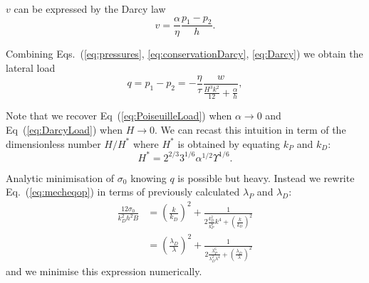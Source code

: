 \documentclass[twocolumn,superscriptaddress,showpacs,preprintnumbers,
amsmath,amssymb,prl]{revtex4-1}
\begin{document}
$v$ can be expressed by the Darcy law
\begin{equation}
v = \frac{\alpha}{\eta} \frac{p_1-p_2}{h}.
\label{eq:Darcy}
\end{equation}

Combining Eqs.~(\ref{eq:pressures}, \ref{eq:conservationDarcy}, \ref{eq:Darcy}) we obtain the lateral load
\begin{equation}
q = p_1-p_2 = - \frac{\eta}{\tau} \frac{w}{\frac{H^3 k^2}{12} + \frac{\alpha}{h}},
\label{eq:MixtLoad}
\end{equation}

Note that we recover Eq~(\ref{eq:PoiseuilleLoad}) when $\alpha \rightarrow 0$ and Eq~(\ref{eq:DarcyLoad}) when $H \rightarrow 0$. We can recast this intuition in term of the dimensionless number $H/H^*$ where $H^*$ is obtained by equating $k_P$ and $k_D$:
\begin{equation}
H^* = 2^{2/3} 3^{1/6} \alpha^{1/2} \Upsilon^{1/6}.
\end{equation}

Analytic minimisation of $\sigma_0$ knowing $q$ is possible but heavy. Instead we rewrite Eq.~(\ref{eq:mecheqop}) in terms of previously calculated $\lambda_P$ and $\lambda_D$:
\begin{align}
\frac{12\sigma_0}{k_D^2 h^2 B} &= \left(\frac{k}{k_D}\right)^2 + \frac{1}{2\frac{k_D^2}{k_P^6}k^4  + \left(\frac{k}{k_D}\right)^2}\\
&= \left(\frac{\lambda_D}{\lambda}\right)^2 + \frac{1}{2\frac{\lambda_P^6}{\lambda_D^2\lambda^4}  + \left(\frac{\lambda_D}{\lambda}\right)^2}
\end{align}
and we minimise this expression numerically.
\end{document}
